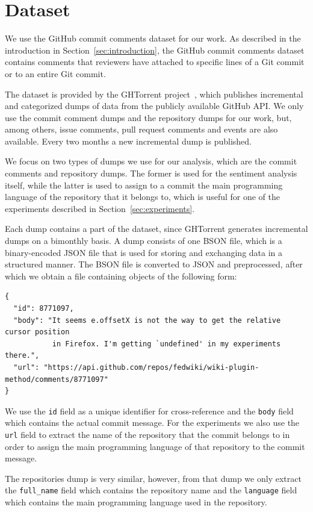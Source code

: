 \documentclass{article}
\begin{document}
\section{Dataset}\label{sec:dataset}
We use the GitHub commit comments dataset for our work. As described in the
introduction in Section~\ref{sec:introduction}, the GitHub commit comments
dataset contains comments that reviewers have attached to specific lines of
a Git commit or to an entire Git commit.

The dataset is provided by the GHTorrent project~\cite{ghtorrent}, which
publishes incremental and categorized dumps of data from the publicly
available GitHub API\@. We only use the commit comment dumps and the
repository dumps for our work, but, among others, issue comments, pull
request comments and events are also available. Every two months a new
incremental dump is published.

We focus on two types of dumps we use for our analysis, which are the
commit comments and repository dumps. The former is used for the sentiment
analysis itself, while the latter is used to assign to a commit the main 
programming language of the repository that it belongs to, which is useful for 
one of the experiments described in Section~\ref{sec:experiments}.

Each dump contains a part of the dataset, since GHTorrent generates incremental 
dumps on a bimonthly basis. A dump consists of one BSON file, which is 
a binary-encoded JSON file that is used for storing and exchanging data in 
a structured manner. The BSON file is converted to JSON and preprocessed, after 
which we obtain a file containing objects of the following form:

\begin{verbatim}
{
  "id": 8771097,
  "body": "It seems e.offsetX is not the way to get the relative cursor position
           in Firefox. I'm getting `undefined' in my experiments there.",
  "url": "https://api.github.com/repos/fedwiki/wiki-plugin-method/comments/8771097"
}
\end{verbatim}

We use the {\tt id} field as a unique identifier for cross-reference and
the {\tt body} field which contains the actual commit message. For the
experiments we also use the {\tt url} field to extract the name of the
repository that the commit belongs to in order to assign the main
programming language of that repository to the commit message.

The repositories dump is very similar, however, from that dump we only
extract the {\tt full\_name} field which contains the repository name and
the {\tt language} field which contains the main programming language used
in the repository.
\end{document}
